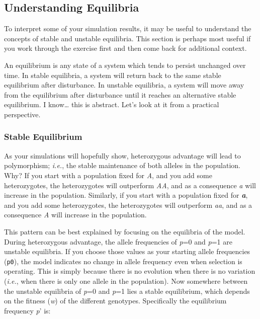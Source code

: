 \documentclass[
]{book}
\begin{document}
\hypertarget{understanding-equilibria}{%
\subsection{Understanding Equilibria}\label{understanding-equilibria}}

To interpret some of your simulation results, it may be useful to understand the concepts of stable and unstable equilibria. This section is perhaps most useful if you work through the exercise first and then come back for additional context.

An equilibrium is any state of a system which tends to persist unchanged over time. In stable equilibria, a system will return back to the same stable equilibrium after disturbance. In unstable equilibria, a system will move away from the equilibrium after disturbance until it reaches an alternative stable equilibrium. I know\ldots{} this is abstract. Let's look at it from a practical perspective.

\hypertarget{stable-equilibrium}{%
\subsubsection*{Stable Equilibrium}\label{stable-equilibrium}}

As your simulations will hopefully show, heterozygous advantage will lead to polymorphism; \emph{i.e.}, the stable maintenance of both alleles in the population. Why? If you start with a population fixed for \emph{A}, and you add some heterozygotes, the heterozygotes will outperform \emph{AA}, and as a consequence \emph{a} will increase in the population. Similarly, if you start with a population fixed for \textbf{\emph{a}}, and you add some heterozygotes, the heterozygotes will outperform \emph{aa}, and as a consequence \emph{A} will increase in the population.

This pattern can be best explained by focusing on the equilibria of the model. During heterozygous advantage, the allele frequencies of \emph{p}=0 and \emph{p}=1 are unstable equilibria. If you choose those values as your starting allele frequencies (\texttt{p0}), the model indicates no change in allele frequency even when selection is operating. This is simply because there is no evolution when there is no variation (\emph{i.e.}, when there is only one allele in the population). Now somewhere between the unstable equilibria of \emph{p}=0 and \emph{p}=1 lies a stable equilibrium, which depends on the fitness (\emph{w}) of the different genotypes. Specifically the equilibrium frequency \emph{p}' is:
\end{document}
